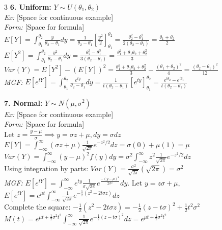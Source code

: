 \documentclass[10pt]{article}
\begin{document}
\begin{multicols*}{3}
\textbf{6. Uniform:} $Y \sim U(\theta_1, \theta_2)$\\
\textit{Ex:} [Space for continuous example]\\
\textit{Form:} [Space for formula]\\
$E[Y] = \int_{\theta_1}^{\theta_2} \frac{y}{\theta_2 - \theta_1} dy = \frac{1}{\theta_2 - \theta_1} [\frac{y^2}{2}]_{\theta_1}^{\theta_2} = \frac{\theta_2^2 - \theta_1^2}{2(\theta_2 - \theta_1)} = \frac{\theta_1 + \theta_2}{2}$\\
$E[Y^2] = \int_{\theta_1}^{\theta_2} \frac{y^2}{\theta_2 - \theta_1} dy = \frac{\theta_2^3 - \theta_1^3}{3(\theta_2 - \theta_1)} = \frac{\theta_1^2 + \theta_1\theta_2 + \theta_2^2}{3}$\\
$Var(Y) = E[Y^2] - (E[Y])^2 = \frac{\theta_1^2 + \theta_1\theta_2 + \theta_2^2}{3} - \frac{(\theta_1 + \theta_2)^2}{4} = \frac{(\theta_2 - \theta_1)^2}{12}$\\
\textit{MGF:} $E[e^{tY}] = \int_{\theta_1}^{\theta_2} \frac{e^{ty}}{\theta_2 - \theta_1} dy = \frac{1}{t(\theta_2 - \theta_1)} [e^{ty}]_{\theta_1}^{\theta_2} = \frac{e^{t\theta_2} - e^{t\theta_1}}{t(\theta_2 - \theta_1)}$

\vspace{2mm}

\textbf{7. Normal:} $Y \sim N(\mu, \sigma^2)$\\
\textit{Ex:} [Space for continuous example]\\
\textit{Form:} [Space for formula]\\
Let $z = \frac{y-\mu}{\sigma} \implies y = \sigma z + \mu, dy = \sigma dz$\\
$E[Y] = \int_{-\infty}^{\infty} (\sigma z + \mu) \frac{1}{\sqrt{2\pi}} e^{-z^2/2} dz = \sigma(0) + \mu(1) = \mu$\\
$Var(Y) = \int_{-\infty}^{\infty} (y-\mu)^2 f(y) dy = \sigma^2 \int_{-\infty}^{\infty} z^2 \frac{1}{\sqrt{2\pi}} e^{-z^2/2} dz$\\
Using integration by parts: $Var(Y) = \frac{\sigma^2}{\sqrt{2\pi}} (\sqrt{2\pi}) = \sigma^2$\\
\textit{MGF:} $E[e^{tY}] = \int_{-\infty}^{\infty} e^{ty} \frac{1}{\sigma\sqrt{2\pi}} e^{\frac{-(y-\mu)^2}{2\sigma^2}} dy$. Let $y=z\sigma+\mu$, \\
$E[e^{tY}] = e^{\mu t} \int_{-\infty}^{\infty} \frac{1}{\sqrt{2\pi}} e^{-\frac{1}{2}(z^2 - 2t\sigma z)} dz$\\
Complete the square: $-\frac{1}{2}(z^2 - 2t\sigma z) = -\frac{1}{2}(z-t\sigma)^2 + \frac{1}{2}t^2\sigma^2$\\
$M(t) = e^{\mu t + \frac{1}{2}\sigma^2 t^2} \int_{-\infty}^{\infty} \frac{1}{\sqrt{2\pi}} e^{-\frac{1}{2}(z-t\sigma)^2} dz = e^{\mu t + \frac{1}{2}\sigma^2 t^2}$


\end{multicols*}
\end{document}
